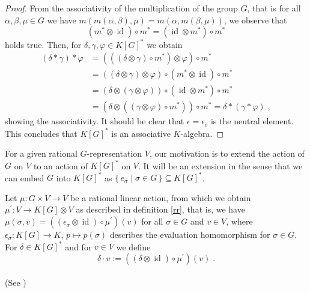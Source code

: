 \begin{proof}
  From the associativity of the multiplication of the group $G$, that is for all $\alpha,\beta,\mu \in G$ we have $m(m(\alpha,\beta),\mu) = m(\alpha,m(\beta,\mu))$, we observe that
  \begin{equation*}
    \left(m^\ast \otimes \operatorname{id} \right) \circ m^\ast = \left( \operatorname{id} \otimes m^\ast \right) \circ m^\ast
  \end{equation*}
  holds true.
  Then, for $\delta, \gamma, \varphi \in K \left\lbrack G \right\rbrack^\ast$ we obtain
  \begin{equation*}
    \begin{aligned}
      \left( \delta \ast \gamma \right) \ast \varphi
      &= \left( \left( \left( \delta \otimes \gamma \right) \circ m^\ast \right) \otimes \varphi \right) \circ m^\ast \\
      &= \left( (\delta \otimes \gamma) \otimes \varphi \right) \circ \left( m^\ast \otimes \operatorname{id} \right) \circ m^\ast  \\
      &= \left( \delta \otimes (\gamma \otimes \varphi) \right) \circ \left( \operatorname{id} \otimes m^\ast \right) \circ m^\ast  \\
      &= \left( \delta \otimes \left( \left( \gamma \otimes \varphi \right) \circ m^\ast \right) \right) \circ m^\ast  
      = \delta \ast \left( \gamma \ast \varphi \right) \; ,
    \end{aligned}
  \end{equation*}
  showing the associativity.
  It should be clear that $\epsilon = \epsilon_e$ is the neutral element.
  This concludes that $K \left\lbrack G \right\rbrack^\ast$ is an associative $K$-algebra.
\end{proof}

For a given rational $G$-representation $V$, our motivation is to extend the action of $G$ on $V$ to an action of $K[G]^\ast$ on $V$.
It will be an extension in the sense that we can embed $G$ into $K[G]^\ast$ as $\{\,e_\sigma \mid \sigma \in G \,\} \subseteq K[G]^\ast$.

\begin{definition}\label{da}
  Let $\mu \colon G \times V \rightarrow V$ be a rational linear action, from which we obtain $\mu^\prime \colon V \rightarrow K[G]\otimes V$ as described in definition \ref{rr}, that is, we have $\mu(\sigma,v) = ((\epsilon_\sigma \otimes \operatorname{id})\circ\mu^\prime)(v)$ for all $\sigma \in G$ and $v \in V$, where $\epsilon_\sigma \colon K[G] \rightarrow K$, $p \mapsto p(\sigma)$ describes the evaluation homomorphism for $\sigma \in G$.
  For $\delta \in K[G]^\ast$ and for $v \in V$ we define
  \begin{equation*}
    \delta \cdot v := \left(\left( \delta \otimes \operatorname{id} \right) \circ \mu^\prime \right) \left(v\right) \; .
  \end{equation*}
  \\
  (See \cite[A.2.9]{DK15})
\end{definition}

